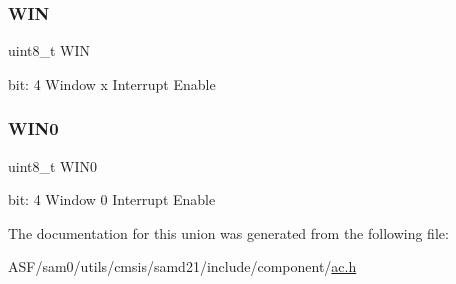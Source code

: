 \subsubsection{\texorpdfstring{WIN}{WIN}}
{\footnotesize\ttfamily uint8\+\_\+t W\+IN}

bit\+: 4 Window x Interrupt Enable \mbox{\label{union_a_c___i_n_t_e_n_c_l_r___type_ab1654ffd18d4bea08938666385d877ef}} 
\subsubsection{\texorpdfstring{WIN0}{WIN0}}
{\footnotesize\ttfamily uint8\+\_\+t W\+I\+N0}

bit\+: 4 Window 0 Interrupt Enable 

The documentation for this union was generated from the following file\+:\begin{DoxyCompactItemize}
\item 
A\+S\+F/sam0/utils/cmsis/samd21/include/component/\mbox{\hyperlink{component_2ac_8h}{ac.\+h}}\end{DoxyCompactItemize}
